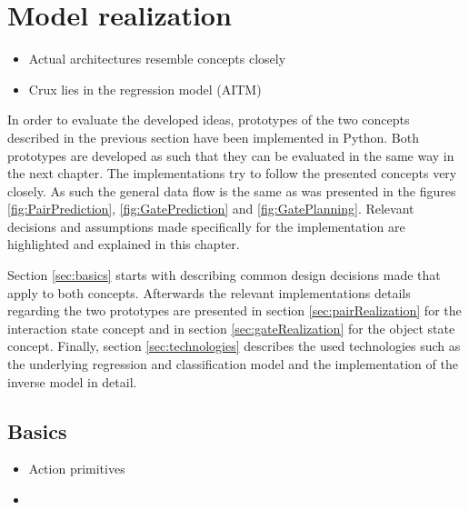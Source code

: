 \chapter{Model realization\label{chap:modelReal}}



\begin{itemize}
	\item Actual architectures resemble concepts closely
	\item Crux lies in the regression model (AITM)
\end{itemize}

In order to evaluate the developed ideas, prototypes of the two concepts described in the previous section have been implemented in Python. Both prototypes are developed as such that they can be evaluated in the same way in the next chapter. The implementations try to follow the presented concepts very closely. As such the general data flow is the same as was presented in the figures  \ref{fig:PairPrediction}, \ref{fig:GatePrediction} and \ref{fig:GatePlanning}.
Relevant decisions and assumptions made specifically for the implementation are highlighted and explained in this chapter. %

Section \ref{sec:basics} starts with describing common design decisions made that apply to both concepts. Afterwards the relevant implementations details regarding the two prototypes are presented in section \ref{sec:pairRealization} for the interaction state concept and in section \ref{sec:gateRealization} for the object state concept. Finally, section \ref{sec:technologies} describes the used technologies such as the underlying regression and classification model and the implementation of the inverse model in detail.

\section{Basics \label{sec:basics}}


\begin{itemize}
\item Action primitives
\item 
\end{itemize}

